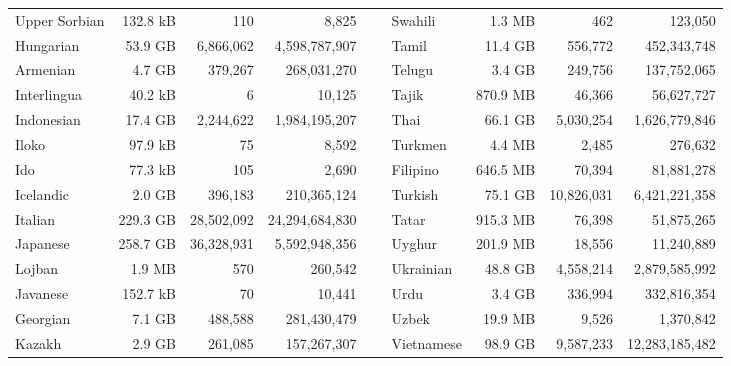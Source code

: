 \begin{table}[ht!]
{\begin{tabular}{lrrrclrrr}
            Upper Sorbian               & 132.8 kB  & 110         & 8,825           & ~ & Swahili           & 1.3 MB    & 462        & 123,050        \\
            Hungarian                   & 53.9 GB   & 6,866,062   & 4,598,787,907   & ~ & Tamil             & 11.4 GB   & 556,772    & 452,343,748    \\
            Armenian                    & 4.7 GB    & 379,267     & 268,031,270     & ~ & Telugu            & 3.4 GB    & 249,756    & 137,752,065    \\
            Interlingua                 & 40.2 kB   & 6           & 10,125          & ~ & Tajik             & 870.9 MB  & 46,366     & 56,627,727     \\
            Indonesian                  & 17.4 GB   & 2,244,622   & 1,984,195,207   & ~ & Thai              & 66.1 GB   & 5,030,254  & 1,626,779,846  \\
            Iloko                       & 97.9 kB   & 75          & 8,592           & ~ & Turkmen           & 4.4 MB    & 2,485      & 276,632        \\
            Ido                         & 77.3 kB   & 105         & 2,690           & ~ & Filipino          & 646.5 MB  & 70,394     & 81,881,278     \\
            Icelandic                   & 2.0 GB    & 396,183     & 210,365,124     & ~ & Turkish           & 75.1 GB   & 10,826,031 & 6,421,221,358  \\
            Italian                     & 229.3 GB  & 28,502,092  & 24,294,684,830  & ~ & Tatar             & 915.3 MB  & 76,398     & 51,875,265     \\
            Japanese                    & 258.7 GB  & 36,328,931  & 5,592,948,356   & ~ & Uyghur            & 201.9 MB  & 18,556     & 11,240,889     \\
            Lojban                      & 1.9 MB    & 570         & 260,542         & ~ & Ukrainian         & 48.8 GB   & 4,558,214  & 2,879,585,992  \\
            Javanese                    & 152.7 kB  & 70          & 10,441          & ~ & Urdu              & 3.4 GB    & 336,994    & 332,816,354    \\
            Georgian                    & 7.1 GB    & 488,588     & 281,430,479     & ~ & Uzbek             & 19.9 MB   & 9,526      & 1,370,842      \\
            Kazakh                      & 2.9 GB    & 261,085     & 157,267,307     & ~ & Vietnamese        & 98.9 GB   & 9,587,233  & 12,283,185,482 \\

\end{tabular}}
\end{table}
